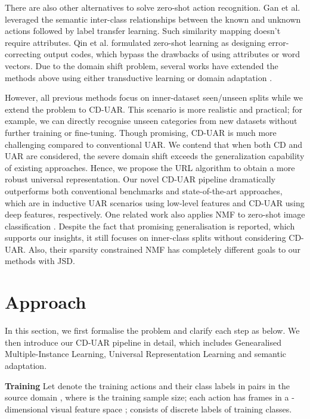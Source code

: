 \documentclass[10pt,twocolumn,letterpaper]{article}
\begin{document}
There are also other alternatives to solve zero-shot action recognition. Gan et al. \cite{SIR_Gan_AAAI15} leveraged the semantic inter-class relationships between the known and unknown actions followed by label transfer learning. Such similarity mapping doesn't require attributes. Qin et al. \cite{2017_CVPR_errorCorection} formulated zero-shot learning as designing error-correcting output codes, which bypass the drawbacks of using attributes or word vectors. Due to the domain shift problem, several works have extended the methods above using either transductive learning \cite{tme_zs_Fu_ECCV14,tran_zsar_Xu_IJCV17} or domain adaptation \cite{unsup_domain_Kodirov_ICCV15,2016_XuXun_prioristised}.

However, all previous methods focus on inner-dataset seen/unseen splits while we extend the problem to CD-UAR. This scenario is more realistic and practical; for example, we can directly recognise unseen categories from new datasets without further training or fine-tuning. Though promising, CD-UAR is much more challenging compared to conventional UAR. 
We contend that when both CD and UAR are considered, the severe domain shift exceeds the generalization capability of existing approaches. Hence, we propose the URL algorithm to obtain a more robust universal representation. Our novel CD-UAR pipeline dramatically outperforms both conventional benchmarks and state-of-the-art approaches, which are in inductive UAR scenarios using low-level features and CD-UAR using deep features, respectively. One related work also applies NMF to zero-shot image classification \cite{2017_CVPR_NMF}. Despite the fact that promising generalisation is reported, which supports our insights, it still focuses on inner-class splits without considering CD-UAR. Also, their sparsity constrained NMF has completely different goals to our methods with JSD.

\section{Approach}
In this section, we first formalise the problem and clarify each step as below. We then introduce our CD-UAR pipeline in detail, which includes Genearalised Multiple-Instance Learning, Universal Representation Learning and semantic adaptation. 

\noindent\textbf{Training} 
Let  denote the training actions and their class labels in pairs in the source domain , where  is the training sample size; each action  has  frames in a -dimensional visual feature space ;  consists of  discrete labels of training classes. 
\end{document}
